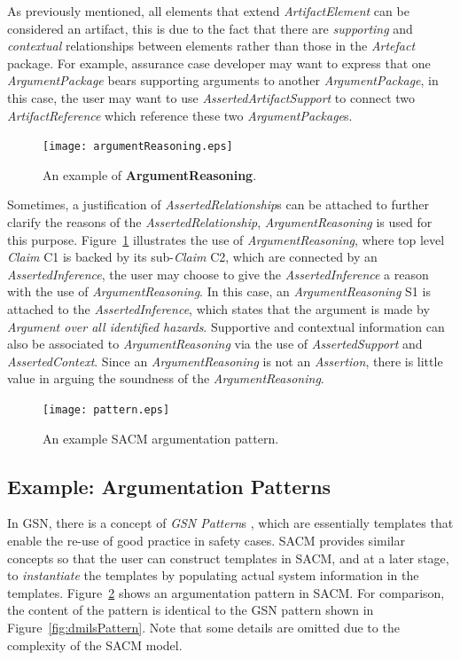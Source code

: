 As previously mentioned, all elements that extend \textit{ArtifactElement} can be considered an artifact, this is due to the fact that there are \textit{supporting} and \textit{contextual} relationships between elements rather than those in the \textit{Artefact} package. For example, assurance case developer may want to express that one \textit{ArgumentPackage} bears supporting arguments to another \textit{ArgumentPackage}, in this case, the user may want to use \textit{AssertedArtifactSupport} to connect two \textit{ArtifactReference} which reference these two \textit{ArgumentPackage}s. 

\begin{figure}
	\centering
	\texttt{[image: argumentReasoning.eps]}
	\caption{An example of \textbf{ArgumentReasoning}.}
	\label{fig:argumentReasoning}
\end{figure}

Sometimes, a justification of \textit{AssertedRelationship}s can be attached to further clarify the reasons of the \textit{AssertedRelationship}, \textit{ArgumentReasoning} is used for this purpose. Figure~\ref{fig:argumentReasoning} illustrates the use of \textit{ArgumentReasoning}, where top level \textit{Claim} C1 is backed by its sub-\textit{Claim} C2, which are connected by an \textit{AssertedInference}, the user may choose to give the \textit{AssertedInference} a reason with the use of \textit{ArgumentReasoning}. In this case, an \textit{ArgumentReasoning} S1 is attached to the \textit{AssertedInference}, which states that the argument is made by \textit{Argument over all identified hazards}. Supportive and contextual information can also be associated to \textit{ArgumentReasoning} via the use of \textit{AssertedSupport} and \textit{AssertedContext}. Since an \textit{ArgumentReasoning} is not an \textit{Assertion}, there is little value in arguing the soundness of the \textit{ArgumentReasoning}. 

\begin{figure}
	\centering
	\texttt{[image: pattern.eps]}
	\caption{An example SACM argumentation pattern.}
	\label{fig:sacmPattern}
\end{figure}

\subsection{Example: Argumentation Patterns}
\label{sec:patterns}
In GSN, there is a concept of \textit{GSN Pattern}s \cite{kelly1997safety}, which are essentially templates that enable the re-use of good practice in safety cases. SACM provides similar concepts so that the user can construct templates in SACM, and at a later stage, to \textit{instantiate} the templates by populating actual system information in the templates. Figure~\ref{fig:sacmPattern} shows an argumentation pattern in SACM. For comparison, the content of the pattern is identical to the GSN pattern shown in Figure~\ref{fig:dmilsPattern}. Note that some details are omitted due to the complexity of the SACM model.


